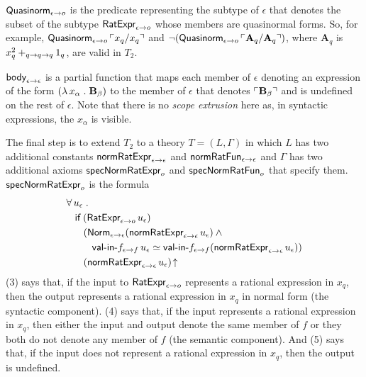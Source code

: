 \documentclass[fleqn]{llncs}
\begin{document}
  \item \bsp $\mbox{\sf Quasinorm}_{\epsilon \rightarrow o}$ is the predicate
    representing the subtype of $\epsilon$ that denotes the subset of
    the subtype $\mbox{\sf RatExpr}_{\epsilon \rightarrow o}$ whose members
    are quasinormal forms.  So, for example,
    $\mbox{\sf Quasinorm}_{\epsilon \rightarrow o} \, \ulcorner x_q/x_q\urcorner$ and
    $\neg(\mbox{\sf Quasinorm}_{\epsilon \rightarrow o} \,
    \ulcorner\textbf{A}_q/\textbf{A}_q\urcorner)$, where $\textbf{A}_q$ is
    $x^{2}_{q} +_{q \rightarrow q \rightarrow q} 1_q$, are valid in
    $T_2$. \esp

  \item $\mbox{\sf body}_{\epsilon \rightarrow \epsilon}$ is a partial
    function that maps each member of $\epsilon$ denoting an
    expression of the form $(\lambda\, x_\alpha \mathrel.
    \textbf{B}_\beta)$ to the member of $\epsilon$ that denotes
    $\ulcorner\textbf{B}_\beta\urcorner$ and is undefined on the rest of $\epsilon$.
    Note that there is no \emph{scope extrusion} here as, in syntactic
    expressions, the $x_{\alpha}$ is visible.

\ee

\bsp The final step is to extend $T_2$ to a theory $T = (L,\Gamma)$ in
which $L$ has two additional constants $\mbox{\sf normRatExpr}_{\epsilon
  \rightarrow \epsilon}$ and $\mbox{\sf normRatFun}_{\epsilon \rightarrow
  \epsilon}$ and $\Gamma$ has two additional axioms
$\mbox{\sf specNormRatExpr}_o$ and $\mbox{\sf specNormRatFun}_o$ that
specify them.  $\mbox{\sf specNormRatExpr}_o$ is the formula
\esp
\begin{align}\label{specNormRatExpr}\setcounter{equation}{0}
&
\ForallApp u_\epsilon \mdot\\
& \hspace*{2ex}
\If \; (\mname{RatExpr}_{\epsilon \tarrow o} \, u_\epsilon)\\
& \hspace*{4ex}
(\mname{Norm}_{\epsilon \tarrow \epsilon}(\mname{normRatExpr}_{\epsilon \tarrow \epsilon} \, u_\epsilon) \And {}\\
& \hspace*{6ex}
\mname{val-in-}f_{\epsilon \tarrow f} \, u_\epsilon \QuasiEqual
\mname{val-in-}f_{\epsilon \tarrow f}(\mname{normRatExpr}_{\epsilon \tarrow \epsilon} \, u_\epsilon))\\
& \hspace*{4ex}
(\mname{normRatExpr}_{\epsilon \tarrow \epsilon} \, u_\epsilon)\IsUndefApp
\end{align}
(3) says that, if the input to $\mbox{\sf RatExpr}_{\epsilon \rightarrow o}$
represents a rational expression in $x_q$, then the output represents
a rational expression in $x_q$ in normal form (the syntactic
component).  (4) says that, if the input represents a rational
expression in $x_q$, then either the input and output denote the same
member of $f$ or they both do not denote any member of $f$ (the
semantic component).  And (5) says that, if the input does not
represent a rational expression in $x_q$, then the output is
undefined.
\end{document}
